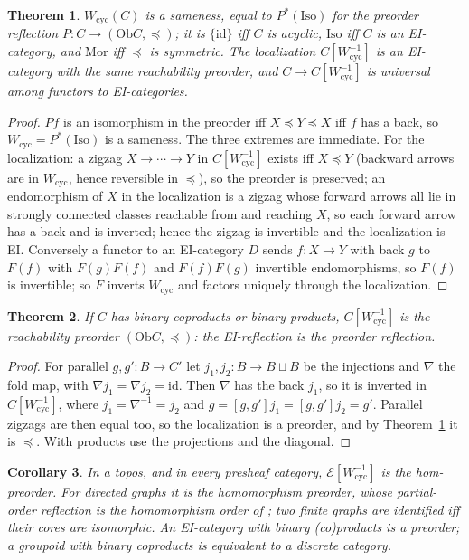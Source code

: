 \documentclass[11pt]{amsart}
\newtheorem{thm}{Theorem}[section]
\newtheorem{cor}[thm]{Corollary}
\theoremstyle{definition}
\newcommand{\Mor}{\mathrm{Mor}}
\newcommand{\Iso}{\mathrm{Iso}}
\newcommand{\E}{\mathcal E}
\newcommand{\Wcyc}{W_{\mathrm{cyc}}}
\newcommand{\Ob}{\mathrm{Ob}}
\begin{document}
\begin{thm}\label{thm:cyc}
$\Wcyc(C)$ is a sameness, equal to $P^*(\Iso)$ for the preorder reflection
$P\colon C\to(\Ob C,\preceq)$; it is $\{\mathrm{id}\}$ iff $C$ is acyclic, $\Iso$ iff
$C$ is an EI-category, and $\Mor$ iff $\preceq$ is symmetric. The localization
$C[\Wcyc^{-1}]$ is an EI-category with the same reachability preorder, and
$C\to C[\Wcyc^{-1}]$ is universal among functors to EI-categories.
\end{thm}
\begin{proof}
$Pf$ is an isomorphism in the preorder iff $X\preceq Y\preceq X$ iff $f$ has a
back, so $\Wcyc=P^*(\Iso)$ is a sameness. The three extremes are immediate. For
the localization: a zigzag $X\to\cdots\to Y$ in $C[\Wcyc^{-1}]$ exists iff
$X\preceq Y$ (backward arrows are in $\Wcyc$, hence reversible in $\preceq$), so
the preorder is preserved; an endomorphism of $X$ in the localization is a
zigzag whose forward arrows all lie in strongly connected classes reachable from
and reaching $X$, so each forward arrow has a back and is inverted; hence the
zigzag is invertible and the localization is EI. Conversely a functor to an
EI-category $D$ sends $f\colon X\to Y$ with back $g$ to $F(f)$ with
$F(g)F(f)$ and $F(f)F(g)$ invertible endomorphisms, so $F(f)$ is invertible; so
$F$ inverts $\Wcyc$ and factors uniquely through the localization.
\end{proof}

\begin{thm}\label{thm:preorder}
If $C$ has binary coproducts or binary products, $C[\Wcyc^{-1}]$ is the
reachability preorder $(\Ob C,\preceq)$: the EI-reflection is the preorder
reflection.
\end{thm}
\begin{proof}
For parallel $g,g'\colon B\to C'$ let $j_1,j_2\colon B\to B\sqcup B$ be the
injections and $\nabla$ the fold map, with $\nabla j_1=\nabla j_2=\mathrm{id}$. Then
$\nabla$ has the back $j_1$, so it is inverted in $C[\Wcyc^{-1}]$, where
$j_1=\nabla^{-1}=j_2$ and $g=[g,g']j_1=[g,g']j_2=g'$. Parallel zigzags are then
equal too, so the localization is a preorder, and by Theorem~\ref{thm:cyc} it
is $\preceq$. With products use the projections and the diagonal.
\end{proof}

\begin{cor}\label{cor:graphs}
In a topos, and in every presheaf category, $\E[\Wcyc^{-1}]$ is the hom-preorder.
For directed graphs it is the homomorphism preorder, whose partial-order
reflection is the homomorphism order of \cite{HN}; two finite graphs are
identified iff their cores are isomorphic. An EI-category with binary
(co)products is a preorder; a groupoid with binary coproducts is equivalent to a
discrete category.
\end{cor}
\end{document}
